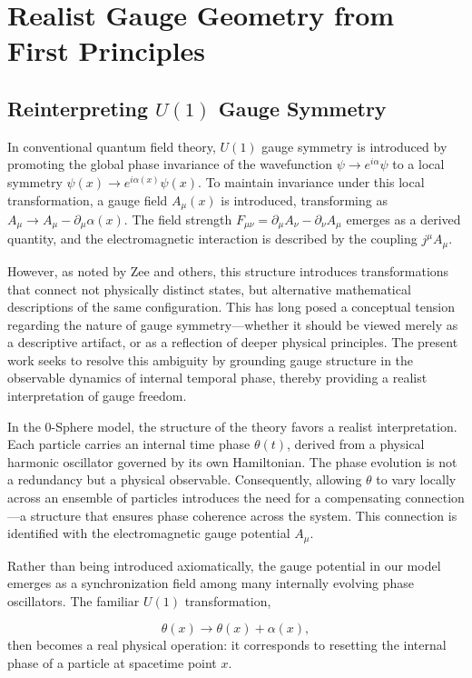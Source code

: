 \documentclass[%
 reprint,
 amsmath,amssymb,
 aps,
]{revtex4-1}
\numberwithin{equation}{section}%
\begin{document}
\section{Realist Gauge Geometry from First Principles}

\subsection{Reinterpreting $U(1)$ Gauge Symmetry}

In conventional quantum field theory, $U(1)$ gauge symmetry is introduced by promoting the global phase invariance of the wavefunction $\psi \to e^{i\alpha} \psi$ to a local symmetry $\psi(x) \to e^{i\alpha(x)} \psi(x)$. To maintain invariance under this local transformation, a gauge field $A_\mu(x)$ is introduced, transforming as $A_\mu \to A_\mu - \partial_\mu \alpha(x)$. The field strength $F_{\mu\nu} = \partial_\mu A_\nu - \partial_\nu A_\mu$ emerges as a derived quantity, and the electromagnetic interaction is described by the coupling $j^\mu A_\mu$.

However, as noted by Zee and others, this structure introduces transformations that connect not physically distinct states, but alternative mathematical descriptions of the same configuration. This has long posed a conceptual tension regarding the nature of gauge symmetry—whether it should be viewed merely as a descriptive artifact, or as a reflection of deeper physical principles. The present work seeks to resolve this ambiguity by grounding gauge structure in the observable dynamics of internal temporal phase, thereby providing a realist interpretation of gauge freedom.

In the 0-Sphere model, the structure of the theory favors a realist interpretation. Each particle carries an internal time phase $\theta(t)$, derived from a physical harmonic oscillator governed by its own Hamiltonian. The phase evolution is not a redundancy but a physical observable. Consequently, allowing $\theta$ to vary locally across an ensemble of particles introduces the need for a compensating connection—a structure that ensures phase coherence across the system. This connection is identified with the electromagnetic gauge potential $A_\mu$.


Rather than being introduced axiomatically, the gauge potential in our model emerges as a synchronization field among many internally evolving phase oscillators. The familiar $U(1)$ transformation,

\begin{equation}
\theta(x) \to \theta(x) + \alpha(x),
\end{equation}
then becomes a real physical operation: it corresponds to resetting the internal phase of a particle at spacetime point $x$.
\end{document}
